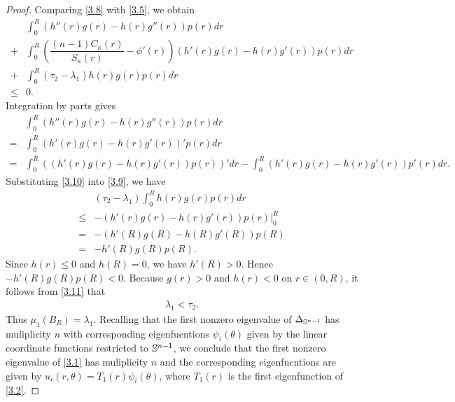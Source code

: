 \documentclass[11pt,leqno]{amsart}
\def\l{\lambda}
\def\S{\Bbb S}
\numberwithin{equation}{section}
\begin{document}
\begin{proof}
Comparing \eqref{3.8} with  \eqref{3.5}, we obtain 
\begin{align}\label{3.9}
    &\int_{0}^{R}\left(h''(r)g(r)-h(r)g''(r)\right)p(r)dr\nonumber\\
    +&\int_{0}^{R}\left(\dfrac{(n-1)C_{\kappa}(r)}{S_{\kappa}(r)} - \phi'(r)\right) \left(h'(r)g(r)-h(r)g'(r)\right)p(r)dr\nonumber\\
    +&\int_{0}^{R}(\tau_2-\l_1)h(r) g(r)p(r)dr\nonumber\\
    \leq& 0.
\end{align}
Integration by parts gives
\begin{align}\label{3.10}
    &\int_{0}^{R}(h''(r)g(r)-h(r)g''(r))p(r)dr\nonumber\\
    =&\int_{0}^{R}(h'(r)g(r)-h(r)g'(r))'p(r)dr\nonumber\\
    =&\int_{0}^{R}((h'(r)g(r)-h(r)g'(r))p(r))'dr-\int_{0}^{R}(h'(r)g(r)-h(r)g'(r))p'(r)dr.
\end{align}
Substituting  \eqref{3.10} into \eqref{3.9}, we have 
\begin{align} \label{3.11}
    &(\tau_2-\l_1)\int_{0}^{R}h(r)g(r)p(r)dr\nonumber\\
    \leq& -(h'(r)g(r)-h(r)g'(r))p(r)\Big|_{0}^{R}\nonumber\\
    =&-(h'(R)g(R)-h(R)g'(R))p(R)\nonumber\\
    =&-h'(R)g(R)p(R).
\end{align}
Since $h(r)\leq 0$ and $h(R)=0$, we have $h'(R)>0$.  Hence  $-h'(R)g(R)p(R)< 0$.
Because $g(r)> 0$ and $h(r)< 0$ on $r\in (0,R)$, it follows from \eqref{3.11} that
\begin{align*}
    \l_1< \tau_2.
\end{align*}
Thus $\mu_1(B_R)=\l_1$. Recalling that the first nonzero eigenvalue of $\Delta_{\S^{n-1}}$ has muliplicity $n$ with corresponding eigenfucntions  $\psi_i(\theta)$ given by  the linear coordinate functions restricted to $\S^{n-1}$, we conclude that the first nonzero eigenvalue of \eqref{3.1} has muliplicity $n$ and the corresponding eigenfucntions are given by $u_i(r, \theta)=T_1(r)\psi_i(\theta)$, where $T_1(r)$ is the first eigenfunction of \eqref{3.2}.
\end{proof}
\end{document}

